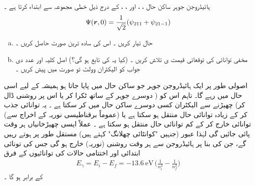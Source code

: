 ہائیڈروجن  جوہر ساکن  حال ، ،   اور  ، ،   کے درج ذیل خطی  مجموعہ   سے ابتداء کرتا ہے ۔
\begin{align*}
\Psi({{\boldsymbol{r}}},0)=\frac{1}{\sqrt{2}}(\psi_{211}+\psi_{21-1})
\end{align*}
\begin{enumerate}[a.]
\item
حال  تیار کریں ۔ اس کی سادہ ترین صورت حاصل کریں ۔
\item
مخفی توانائی  کی توقعاتی قیمت ی    تلاش کریں ۔ (کیا یہ   کی  تابع ہو گی؟)  اصل کلیہ اور عدد دی جواب   کو الیکٹران وولٹ تو صورت میں پیش کریں ۔
\end{enumerate}

اصولی طور پر ایک ہائیڈروجن جوہر جو ساکن حال  میں پایا جاتا ہو  ہمیشہ کے لیے اسی حال میں رہے گا۔ تاہم اس کو (  دوسرے جوہر کے ساتھ ٹکرا کر  یا اس پر روشنی  ڈال کر)  چھیڑنے سے الیکٹران کسی دوسرے ساکن حال میں  کر سکتا ہے ۔ یہ توانائی جذب کر کے زیادہ توانائی  حال منتقل ہو سکتا ہے یا   (عموماً   برقناطیسی   نوریہ کے  اخراج   سے)     توانائی خارج کر  کے کم توانائی  حال  منتقل ہو سکتا ہے ۔ عملاً  ایسی چھیڑخانیاں  ہر وقت پائی جائیں گی لہٰذا عبور (جنہیں  "کوانٹائی  چھلانگ" کہتے ہیں)   مستقل طور پر ہوتے  رہیں    گے، جن  کی  بنا پر  ہائیڈروجن  سے ہر وقت   روشنی (نوریہ)  خارج ہو گی جس کی تونائی   ابتدائی اور اختتامی حالات کی  توانائیوں  کے فرق
\begin{align}
E_{\gamma}=E_{i}-E_{f}=\SI{-13.6}{\electronvolt}\,\big(\frac{1}{n^{2}_{i}}-\frac{1}{n^{2}_{f}}\big)
\end{align}
 کے برابر ہو گا ۔
 
